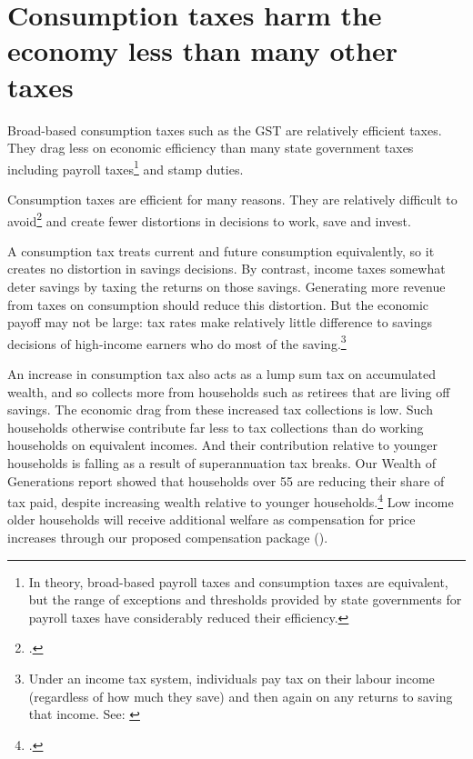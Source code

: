 \section{Consumption taxes harm the economy less than many other taxes}\label{sec:GST-1-2}
Broad-based consumption taxes such as the GST are relatively efficient taxes. They drag less on economic efficiency than many state government taxes including payroll taxes\footnote{In theory, broad-based payroll taxes and consumption taxes are equivalent, but the range of exceptions and thresholds provided by state governments for payroll taxes have considerably reduced their efficiency.}  and stamp duties.  

Consumption taxes are efficient for many reasons. They are relatively difficult to avoid\footcite[][274]{HenryTaxReview2010}  and create fewer distortions in decisions to work, save and invest. 

A consumption tax treats current and future consumption equivalently, so it creates no distortion in savings decisions. By contrast, income taxes somewhat deter savings by taxing the returns on those savings.  Generating more revenue from taxes on consumption should reduce this distortion. But the economic payoff may not be large: tax rates make relatively little difference to savings decisions of high-income earners who do most of the saving.\footnote{Under an income tax system, individuals pay tax on their labour income (regardless of how much they save) and then again on any returns to saving that income. See: \textcite{HenryTaxReview2010}}    

An increase in consumption tax also acts as a lump sum tax on accumulated wealth, and so collects more from households such as retirees that are living off savings. The economic drag from these increased tax collections is low. Such households otherwise contribute far less to tax collections than do working households on equivalent incomes.  And their contribution relative to younger households is falling as a result of superannuation tax breaks. Our Wealth of Generations report showed that households over 55 are reducing their share of tax paid, despite increasing wealth relative to younger households.\footcite[][27]{DaleyWoodWeidmannEtAl2014}  Low income older households will receive additional welfare as compensation for price increases through our proposed compensation package ().

